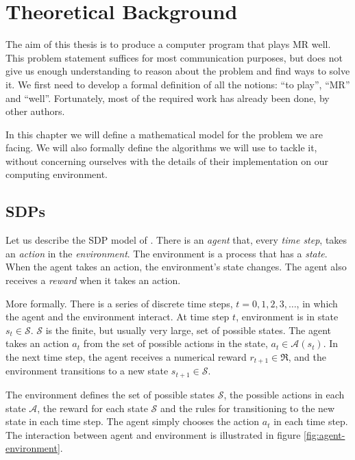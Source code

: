 \chapter{Theoretical Background}
The aim of this thesis is to produce a computer program that plays \acl{MR}
well. This problem statement suffices for most communication purposes, but does
not give us enough understanding to reason about the problem and find ways to
solve it. We first need to develop a formal definition of all the notions: ``to
play'', ``\acl{MR}'' and ``well''. Fortunately, most of the required work has
already been done, by other authors.

In this chapter we will define a mathematical model for the problem we are
facing. We will also formally define the algorithms we will use to tackle it,
without concerning ourselves with the details of their implementation on our
computing environment.

\section{\aclp{SDP}}
Let us describe the \acf{SDP} model of
\cite[Section~3.1]{sutton1998introduction}. There is an \emph{agent} that, every
\emph{time step}, takes an \emph{action} in the \emph{environment}. The
environment is a process that has a \emph{state}. When the agent takes an
action, the environment's state changes. The agent also receives a \emph{reward}
when it takes an action.

More formally. There is a series of discrete time steps, $t=0,1,2,3,\dots$, in
which the agent and the environment interact. At time step $t$, environment is
in state $s_t \in \mathcal{S}$. $\mathcal{S}$ is the finite, but usually very
large, set of possible states. The agent takes an action $a_t$ from the set of
possible actions in the state, $a_t \in \mathcal{A}(s_t)$. In the next time
step, the agent receives a numerical reward $r_{t+1} \in \mathfrak{R}$, and the
environment transitions to a new state $s_{t+1} \in \mathcal{S}$.

The environment defines the set of possible states $\mathcal{S}$, the possible
actions in each state $\mathcal{A}$, the reward for each state $\mathcal{S}$ and
the rules for transitioning to the new state in each time step. The agent simply
chooses the action $a_t$ in each time step. The interaction between agent and
environment is illustrated in figure \ref{fig:agent-environment}.


